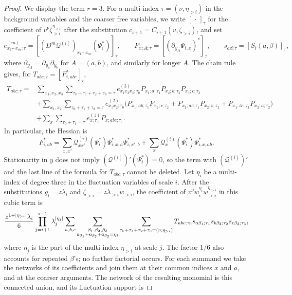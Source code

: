 \begin{proof}
We display the term $r=3$. For a multi-index $\tau=(\nu,\eta_{>i})$ in the background variables and the coarser free variables, we write $[\,\cdot\,]_\tau$ for the coefficient of $v^\nu\zeta_{>i}^{\eta_{>i}}$ after the substitution $c_{i+1}=C_{i+1}(v,\zeta_{>i})$, and set
\[
 e^{(m)}_{x_1\cdots x_m;\tau}=[(D^m\mathcal Q^{(i)})_{x_1\cdots x_m}(\Psi_i^*)]_\tau,\qquad
 P_{x;A;\tau}=[(\partial_{y_A}\Psi_{i,x})^*]_\tau,\qquad
 s_{a\beta;\tau}=[S_i(a,\beta)]_\tau,
\]
where $\partial_{y_A}=\partial_{y_a}\partial_{y_b}$ for $A=(a,b)$, and similarly for longer $A$. The chain rule gives, for $T_{abc;\tau}=[F_{i,abc}^*]_\tau$,
\begin{align*}
 T_{abc;\tau}={}&\sum_{x_1,x_2,x_3}\sum_{\tau_0+\tau_1+\tau_2+\tau_3=\tau}e^{(3)}_{x_1x_2x_3;\tau_0}P_{x_1;a;\tau_1}P_{x_2;b;\tau_2}P_{x_3;c;\tau_3}\\
 &+\sum_{x_1,x_2}\sum_{\tau_0+\tau_1+\tau_2=\tau}e^{(2)}_{x_1x_2;\tau_0}\bigl(P_{x_1;ab;\tau_1}P_{x_2;c;\tau_2}+P_{x_1;ac;\tau_1}P_{x_2;b;\tau_2}+P_{x_1;bc;\tau_1}P_{x_2;a;\tau_2}\bigr)\\
 &+\sum_x\sum_{\tau_0+\tau_1=\tau}e^{(1)}_{x;\tau_0}P_{x;abc;\tau_1}.
\end{align*}
In particular, the Hessian is
\[
 F_{i,ab}^*=\sum_{x,x'}\mathcal Q^{(i)}_{xx'}(\Psi_i^*)\Psi_{i,x,a}^*\Psi_{i,x',b}^*+\sum_x\mathcal Q^{(i)}_x(\Psi_i^*)\Psi_{i,x,ab}^*.
\]
Stationarity in $y$ does not imply $(\mathcal Q^{(i)})'(\Psi_i^*)=0$, so the term with $(\mathcal Q^{(i)})'$ and the last line of the formula for $T_{abc;\tau}$ cannot be deleted. Let $\eta_i$ be a multi-index of degree three in the fluctuation variables of scale $i$. After the substitutions $g_l=z\lambda_l$ and $\zeta_{>i}=z\lambda_{>i}w_{>i}$, the coefficient of $v^\nu w_i^{\eta_i}w_{>i}^{\eta_{>i}}$ in this cubic term is
\begin{equation}\label{ch17:eq:cubic-primitive}
 \frac{z^{1+\lvert \eta_{>i}\rvert}\lambda_i}6\prod_{j=i+1}^{s-1}\lambda_j^{\lvert \eta_j\rvert}\sum_{a,b,c}\sum_{\substack{\beta_1,\beta_2,\beta_3\\ \mathbf e_{\beta_1}+\mathbf e_{\beta_2}+\mathbf e_{\beta_3}=\eta_i}}\sum_{\tau_0+\tau_1+\tau_2+\tau_3=(\nu,\eta_{>i})}T_{abc;\tau_0}s_{a\beta_1;\tau_1}s_{b\beta_2;\tau_2}s_{c\beta_3;\tau_3},
\end{equation}
where $\eta_j$ is the part of the multi-index $\eta_{>i}$ at scale $j$. The factor $1/6$ also accounts for repeated $\beta$'s; no further factorial occurs. For each summand we take the networks of its coefficients and join them at their common indices $x$ and $a$, and at the coarser arguments. The network of the resulting monomial is this connected union, and its fluctuation support is

\end{proof}
